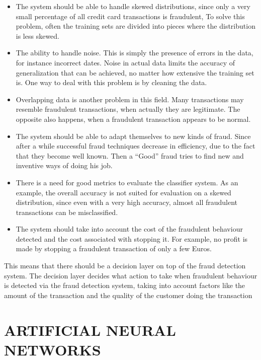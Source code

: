 \documentclass{report}
\begin{document}
\begin{itemize}
  \item The system should be able to handle skewed distributions, since only a very small percentage of all credit card transactions is fraudulent, To solve this problem, often the training sets are divided into pieces where the distribution is less skewed.

  \item The ability to handle noise. This is simply the presence of errors in the data, for instance incorrect dates. Noise in actual data limits the accuracy of generalization that can be achieved, no matter how extensive the training set is. One way to deal with this problem is by cleaning the data. 
  
  \item Overlapping data is another problem in this field. Many transactions may resemble fraudulent transactions, when actually they are legitimate. The opposite also happens, when a fraudulent transaction appears to be normal. 


\item The system should be able to adapt themselves to new kinds of fraud. Since after a while successful fraud techniques decrease in efficiency, due to the fact that they become well known. Then a “Good” fraud tries to find new and inventive ways of doing his job.

\item There is a need for good metrics to evaluate the classifier system. As an example, the overall accuracy is not suited for evaluation on a skewed distribution, since even with a very high accuracy, almost all fraudulent transactions can be misclassified. 

\item The system should take into account the cost of the fraudulent behaviour detected and the cost associated with stopping it. For example, no profit is made by stopping a fraudulent transaction of only a few Euros. 


\end{itemize}

This means that there should be a decision layer on top of the fraud detection system. The decision layer decides what action to take when fraudulent behaviour is detected via the fraud detection system, taking into account factors like the amount of the transaction and the quality of the customer doing the transaction 

\chapter{ARTIFICIAL NEURAL NETWORKS}
\end{document}
